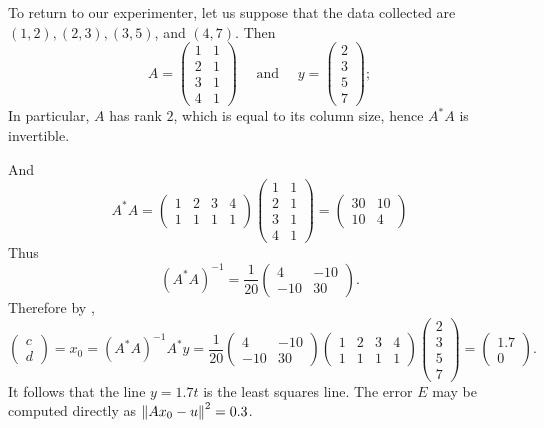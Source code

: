 To return to our experimenter, let us suppose that the data collected are \((1, 2), (2, 3), (3, 5)\), and \((4, 7)\).
Then
\[
    A = \begin{pmatrix} 1 & 1 \\ 2 & 1 \\ 3 & 1 \\ 4 & 1 \end{pmatrix}
    \quad \text{ and } \quad y = \begin{pmatrix} 2 \\ 3 \\ 5 \\ 7 \end{pmatrix};
\]
In particular, \(A\) has rank \(2\), which is equal to its column size, hence \(A^* A\) is invertible.

And
\[
    A^* A =
    \begin{pmatrix} 1 & 2 & 3 & 4 \\ 1 & 1 & 1 & 1 \end{pmatrix}
    \begin{pmatrix} 1 & 1 \\ 2 & 1 \\ 3 & 1 \\ 4 & 1 \end{pmatrix}
    = \begin{pmatrix} 30 & 10 \\ 10 & 4 \end{pmatrix}
\]
Thus
\[
    (A^* A)^{-1} = \frac{1}{20} \begin{pmatrix}
        4 & -10 \\ -10 & 30
    \end{pmatrix}.
\]
Therefore by ,
\[
    \begin{pmatrix} c \\ d \end{pmatrix} = x_0
    = (A^* A)^{-1} A^* y
    = \frac{1}{20} \begin{pmatrix}
        4 & -10 \\ -10 & 30
    \end{pmatrix}
    \begin{pmatrix} 1 & 2 & 3 & 4 \\ 1 & 1 & 1 & 1 \end{pmatrix}
    \begin{pmatrix} 2 \\ 3 \\ 5 \\ 7 \end{pmatrix}
    = \begin{pmatrix} 1.7 \\ 0 \end{pmatrix}.
\]
It follows that the line \(y = 1.7t\) is the least squares line.
The error \(E\) may be computed directly as \(\left\lVert Ax_0 - u\right\rVert^2 = 0.3\).

